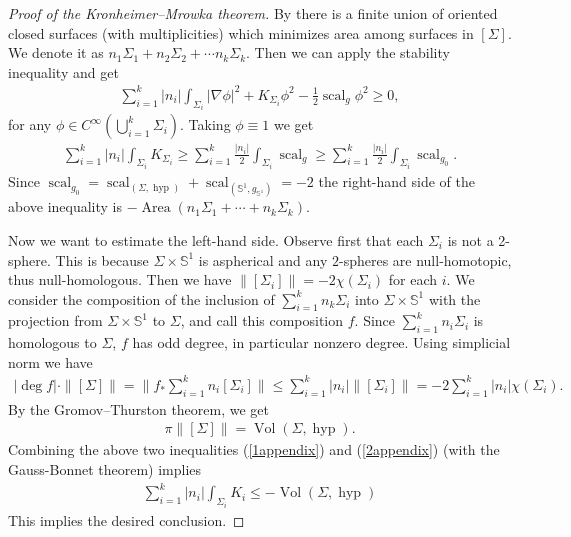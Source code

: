\documentclass[12pt]{amsart}
\numberwithin{equation}{section}
\begin{document}
 \begin{proof}[Proof of the Kronheimer--Mrowka theorem]
  By \cite[Lemma 2.1]{Hass88} there is a finite union of oriented
  closed surfaces (with multiplicities) which minimizes area among
  surfaces in $[\Sigma]$. We denote it as $n_1 \Sigma_1 + n_2 \Sigma_2
  +\cdots n_k \Sigma_k$. Then we can apply the stability inequality and get
  \begin{align*}
   \sum_{i=1}^k |n_i| \int_{\Sigma_i} |\nabla \phi|^2 + K_{\Sigma_i} \phi^2 -\frac{1}{2}
   {\mathop{\mathrm{scal}} \nolimits}_g \phi^2 \geq 0 ,
   \end{align*}for any $\phi \in C^{\infty}(\bigcup_{i=1}^k \Sigma_i
  )$. Taking $\phi \equiv 1$ we get 
  \begin{align*}
   \sum_{i=1}^k |n_i|\int_{\Sigma_i} K_{\Sigma_i}\geq
   \sum_{i=1}^k \frac{|n_i|}{2}\int_{\Sigma_i}{\mathop{\mathrm{scal}} \nolimits}_g\geq \sum_{i=1}^k\frac{|n_i|}{2}\int_{\Sigma_i} {\mathop{\mathrm{scal}} \nolimits}_{g_0}.
   \end{align*}Since
  ${\mathop{\mathrm{scal}} \nolimits}_{g_0}={\mathop{\mathrm{scal}} \nolimits}_{(\Sigma,\operatorname{hyp})}+{\mathop{\mathrm{scal}} \nolimits}_{(\mathbb{S}^1,g_{\mathbb{S}^1})}=-2$ the
  right-hand side of the above inequality is $-\operatorname{Area}(n_1\Sigma_1+\cdots
  +n_k \Sigma_k)$.

  Now we want to estimate the left-hand side.
  Observe first that each $\Sigma_i$ is not a 2-sphere. This is because
  $\Sigma\times \mathbb{S}^1$ is aspherical and any $2$-spheres are
  null-homotopic, thus null-homologous. Then we have
  $\|[\Sigma_i]\|=-2\chi (\Sigma_i)$ for each $i$. We consider the composition of the
  inclusion of $\sum_{i=1}^k n_k \Sigma_i$ into
  $\Sigma\times \mathbb{S}^1$ with the projection from $\Sigma\times
  \mathbb{S}^1$ to $\Sigma$, and call this composition $f$. Since
  $\sum_{i=1}^k n_i \Sigma_i$ is homologous to $\Sigma$, $f$ has odd degree, in particular
  nonzero degree. Using simplicial norm we have
  \begin{align}\label{1appendix}
   |\deg f| \cdot \| [\Sigma]\|= \|f_{\ast}\sum_{i=1}^k n_i
   [\Sigma_i]\|\leq \sum_{i=1}^k |n_i|
   \|[\Sigma_i]\|=-2\sum_{i=1}^k|n_i|\chi (\Sigma_i).
   \end{align}By the Gromov--Thurston theorem, we get
  \begin{align}\label{2appendix}
   \pi \| [\Sigma]\|=\operatorname{Vol} (\Sigma, \operatorname{hyp}).
   \end{align}Combining the above two inequalities (\ref{1appendix}) and
  (\ref{2appendix}) (with the Gauss-Bonnet theorem) implies
  \begin{align*}
  \sum_{i=1}^k |n_i|\int_{\Sigma_i} K_i \leq -\operatorname{Vol}(\Sigma,\operatorname{hyp})
   \end{align*}This implies the desired conclusion.
 \end{proof}
\end{document}
